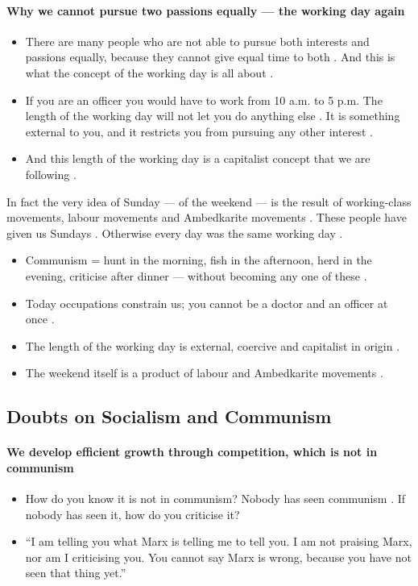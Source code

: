 \paragraph{Why we cannot pursue two passions equally --- the working day again}
\begin{itemize}
    \item There are many people who are not able to pursue both interests and passions equally, because they cannot give equal time to both . And this is what the concept of the working day is all about .
    \item If you are an officer you would have to work from 10 a.m. to 5 p.m. The length of the working day will not let you do anything else . It is something external to you, and it restricts you from pursuing any other interest .
    \item And this length of the working day is a capitalist concept that we are following .
\end{itemize}

\begin{CriticalPoint}
In fact the very idea of Sunday --- of the weekend --- is the result of working-class movements, labour movements and Ambedkarite movements . These people have given us Sundays . Otherwise every day was the same working day .
\end{CriticalPoint}

\begin{QuickRevision}
\begin{itemize}
    \item Communism = hunt in the morning, fish in the afternoon, herd in the evening, criticise after dinner --- without becoming any one of these .
    \item Today occupations constrain us; you cannot be a doctor and an officer at once .
    \item The length of the working day is external, coercive and capitalist in origin .
    \item The weekend itself is a product of labour and Ambedkarite movements .
\end{itemize}
\end{QuickRevision}

\subsection{Doubts on Socialism and Communism}

\paragraph{We develop efficient growth through competition, which is not in communism}
\begin{itemize}
    \item How do you know it is not in communism? Nobody has seen communism . If nobody has seen it, how do you criticise it? 
    \item ``I am telling you what Marx is telling me to tell you. I am not praising Marx, nor am I criticising you. You cannot say Marx is wrong, because you have not seen that thing yet.'' 
\end{itemize}

